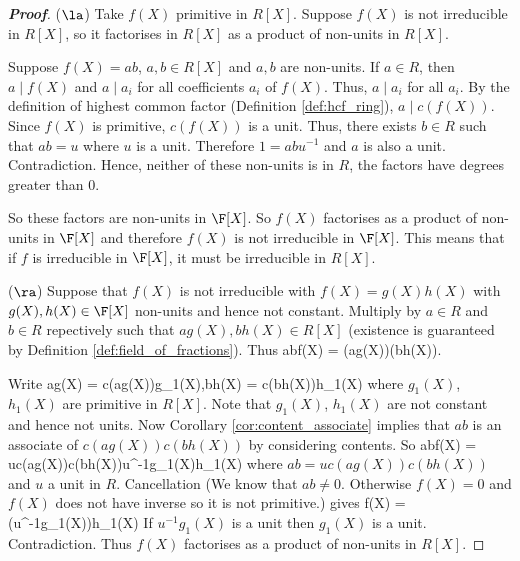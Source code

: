 \begin{proof}[\bf Proof]
($\la$) Take $f(X)$ primitive in $R[X]$. Suppose $f(X)$ is not irreducible in $R[X]$, so it factorises in $R[X]$ as a product of non-units in $R[X]$.

Suppose $f(X) = ab$, $a,b\in R[X]$ and $a,b$ are non-units. If $a\in R$, then $a\mid f(X)$ and $a\mid a_i$ for all coefficients $a_i$ of $f(X)$. Thus, $a\mid a_i$ for all $a_i$. By the definition of highest common factor (Definition \ref{def:hcf_ring}), $a\mid c(f(X))$. Since $f(X)$ is primitive, $c(f(X))$ is a unit. Thus, there exists $b\in R$ such that $ab = u$ where $u$ is a unit. Therefore $1 = a bu^{-1}$ and $a$ is also a unit. Contradiction. Hence, neither of these non-units is in $R$, the factors have degrees greater than 0.



So these factors are non-units in $\F[X]$. So $f(X)$ factorises as a product of non-units in $\F[X]$ and therefore $f(X)$ is not irreducible in $\F[X]$. This means that if $f$ is irreducible in $\F[X]$, it must be irreducible in $R[X]$.

($\ra$) Suppose that $f(X)$ is not irreducible with $f(X) = g(X)h(X)$ with $g(X), h(X) \in \F[X]$ non-units and hence not constant. Multiply by $a \in R$ and $b \in R$ repectively such that $ag(X), bh(X) \in R[X]$ (existence is guaranteed by Definition \ref{def:field_of_fractions}). Thus
\be
abf(X) = (ag(X))(bh(X)).
\ee

Write
\be
ag(X) = c(ag(X))g_1(X),\quad\quad bh(X) = c(bh(X))h_1(X)
\ee
where $g_1(X)$, $h_1(X)$ are primitive in $R[X]$. Note that $g_1(X)$, $h_1(X)$ are not constant and hence not units. Now Corollary \ref{cor:content_associate} implies that $ab$ is an associate of $c(ag(X))c(bh(X))$ by considering contents. So
\be
abf(X) = uc(ag(X))c(bh(X))u^{-1}g_1(X)h_1(X)
\ee
where $ab = uc(ag(X))c(bh(X))$ and $u$ a unit in $R$. Cancellation (We know that $ab\neq 0$. Otherwise $f(X) = 0$ and $f(X)$ does not have inverse so it is not primitive.) gives
\be
f(X) = (u^{-1}g_1(X))h_1(X)
\ee
If $u^{-1}g_1(X)$ is a unit then $g_1(X)$ is a unit. Contradiction. Thus $f(X)$ factorises as a product of non-units in $R[X]$.
\end{proof}



